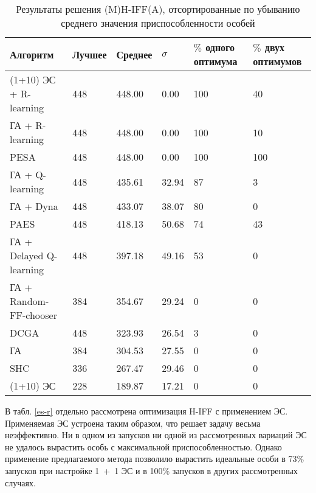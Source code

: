 \begin{table}[ht]
\begin{center}
\caption{Результаты решения (M)H-IFF(A), отсортированные по убыванию среднего значения приспособленности особей} \label{ga-rl}
\begin{tabular}{|l|l|l|l|l|l|}
\hline
Алгоритм & Лучшее & Среднее & $\sigma$ & $\%$ одного оптимума & $\%$ двух оптимумов\\
\hline
\rowcolor{light-gray}
(1+10) ЭС + R-learning & 448 & 448.00 & 0.00 & 100 & 40\\
\rowcolor{light-gray}
ГА + R-learning & 448 & 448.00 & 0.00  & 100 & 10 \\
PESA \cite{pesa}   & 448 & 448.00 & 0.00  & 100 & 100 \\
\rowcolor{light-gray}
ГА + Q-learning & 448 & 435.61 & 32.94 & 87 & 3 \\
\rowcolor{light-gray}
ГА + Dyna & 448 & 433.07 & 38.07 & 80 & 0 \\
PAES \cite{paes}    & 448 & 418.13 & 50.68 & 74  & 43 \\
\rowcolor{light-gray}
ГА + Delayed Q-learning & 448 & 397.18 & 49.16 & 53 & 0\\
ГА + Random-FF-chooser & 384 & 354.67 & 29.24 & 0 & 0 \\
DCGA \cite{dcga}    & 448 & 323.93 & 26.54 & 3   & 0 \\
ГА & 384 & 304.53 & 27.55 & 0 & 0\\
SHC \cite{mh-iff} & 336 & 267.47 & 29.46 & 0   & 0 \\
(1+10) ЭС & 228 & 189.87 & 17.21 & 0 & 0\\\hline
\end{tabular}
\end{center}
\end{table}

В табл. \ref{es-r} отдельно рассмотрена оптимизация H-IFF с применением ЭС. Применяемая ЭС устроена таким образом, что решает задачу весьма неэффективно. Ни в одном из запусков ни одной из рассмотренных вариаций ЭС не удалось вырастить особь с максимальной приспособленностью. Однако применение предлагаемого метода позволило вырастить идеальные особи в 73\% запусков при настройке 1~+~1 ЭС и в 100\% запусков в других рассмотренных случаях.


